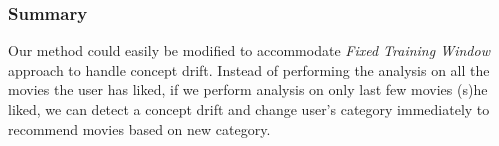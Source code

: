  \subsubsection{Summary}
 Our method could easily be modified to accommodate \textit{Fixed Training Window} approach to handle concept drift. Instead of performing the analysis on all the movies the user has liked, if we perform analysis on only last few movies (s)he liked, we can detect a concept drift and change user's category immediately to recommend movies based on new category.